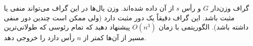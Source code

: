 %
%	

گراف وزن‌دار $G$ و رأس $s$ از آن داده شده‌اند. وزن یال‌ها در این گراف می‌تواند منفی یا مثبت باشد. این گراف دقیقاً یک دور مثبت دارد (ولی ممکن است چندین دور منفی داشته باشد). الگوریتمی با زمان $O(n^3)$ پیشنهاد دهید که تمام رئوسی که طولانی‌ترین مسیر از آن‌ها کمتر از $n$ رأس دارد را خروجی دهد.



